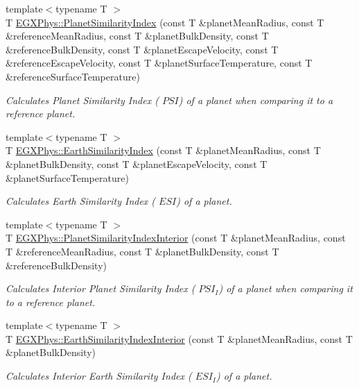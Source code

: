 \begin{DoxyCompactItemize}
\item 
{\footnotesize template$<$typename T $>$ }\\T \hyperlink{group___astrophysics_ga62e8b781c301df60bd04af3183a965eb}{E\+G\+X\+Phys\+::\+Planet\+Similarity\+Index} (const T \&planet\+Mean\+Radius, const T \&reference\+Mean\+Radius, const T \&planet\+Bulk\+Density, const T \&reference\+Bulk\+Density, const T \&planet\+Escape\+Velocity, const T \&reference\+Escape\+Velocity, const T \&planet\+Surface\+Temperature, const T \&reference\+Surface\+Temperature)
\begin{DoxyCompactList}\small\item\em Calculates Planet Similarity Index ( $PSI$) of a planet when comparing it to a reference planet. \end{DoxyCompactList}\item 
{\footnotesize template$<$typename T $>$ }\\T \hyperlink{group___astrophysics_ga4b86397b1c839c49ac599d49fda207d4}{E\+G\+X\+Phys\+::\+Earth\+Similarity\+Index} (const T \&planet\+Mean\+Radius, const T \&planet\+Bulk\+Density, const T \&planet\+Escape\+Velocity, const T \&planet\+Surface\+Temperature)
\begin{DoxyCompactList}\small\item\em Calculates Earth Similarity Index ( $ESI$) of a planet. \end{DoxyCompactList}\item 
{\footnotesize template$<$typename T $>$ }\\T \hyperlink{group___astrophysics_ga6dc06a1a8baf6e132abed51fcf410c7f}{E\+G\+X\+Phys\+::\+Planet\+Similarity\+Index\+Interior} (const T \&planet\+Mean\+Radius, const T \&reference\+Mean\+Radius, const T \&planet\+Bulk\+Density, const T \&reference\+Bulk\+Density)
\begin{DoxyCompactList}\small\item\em Calculates Interior Planet Similarity Index ( $PSI_I$) of a planet when comparing it to a reference planet. \end{DoxyCompactList}\item 
{\footnotesize template$<$typename T $>$ }\\T \hyperlink{group___astrophysics_ga699bcc2f17b8855eaa856595d8032f61}{E\+G\+X\+Phys\+::\+Earth\+Similarity\+Index\+Interior} (const T \&planet\+Mean\+Radius, const T \&planet\+Bulk\+Density)
\begin{DoxyCompactList}\small\item\em Calculates Interior Earth Similarity Index ( $ESI_I$) of a planet. \end{DoxyCompactList}\item 

\end{DoxyCompactItemize}
